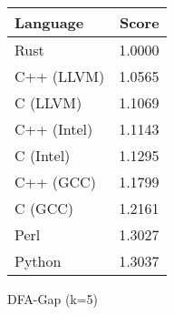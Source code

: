 \begin{subtable}{0.33\textwidth}
    \centering
    \begin{tabular}{|l|r|}
        \hline
        Language & Score \\
        \hline
        Rust & 1.0000 \\
        C++ (LLVM) & 1.0565 \\
        C (LLVM) & 1.1069 \\
        C++ (Intel) & 1.1143 \\
        C (Intel) & 1.1295 \\
        C++ (GCC) & 1.1799 \\
        C (GCC) & 1.2161 \\
        Perl & 1.3027 \\
        Python & 1.3037 \\
        \hline
    \end{tabular}
    \caption{DFA-Gap (k=5)}
    \label{table:energy:dfa_gap(5)}
\end{subtable}

